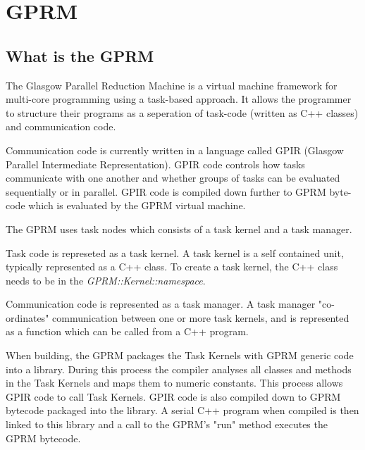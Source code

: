 \section{GPRM}

\subsection{What is the GPRM}

The Glasgow Parallel Reduction Machine is a virtual machine framework for multi-core programming using a task-based approach. It allows the programmer to structure their programs as a seperation of task-code (written as C++ classes) and communication code. 

Communication code is currently written in a language called GPIR (Glasgow Parallel Intermediate Representation). 
GPIR code controls how tasks communicate with one another and whether groups
of tasks can be evaluated sequentially or in parallel.  GPIR code is compiled down further to GPRM byte-code which is evaluated by the GPRM virtual machine.

The GPRM uses task nodes which consists of a task kernel and a task manager.

Task code is represeted as a task kernel. A task kernel is a self contained unit, typically represented as a C++ class.
To create a task kernel, the C++ class needs to be in the \textit{GPRM::Kernel::namespace}.

Communication code is represented as a task manager. A task manager "co-ordinates" communication between one or more task kernels, and
is represented as a function which can be called from a C++ program.\cite{GPRM}


When building, the GPRM packages the Task Kernels with 
GPRM generic code into a library. During this process the compiler analyses all classes and methods in the
Task Kernels and maps them to numeric constants. This process allows GPIR code to call Task Kernels.
GPIR code is also compiled down to GPRM bytecode packaged into the library. A serial C++ program when compiled is then linked to
this library and a call to the GPRM's "run" method executes the GPRM bytecode. 

\newpage

